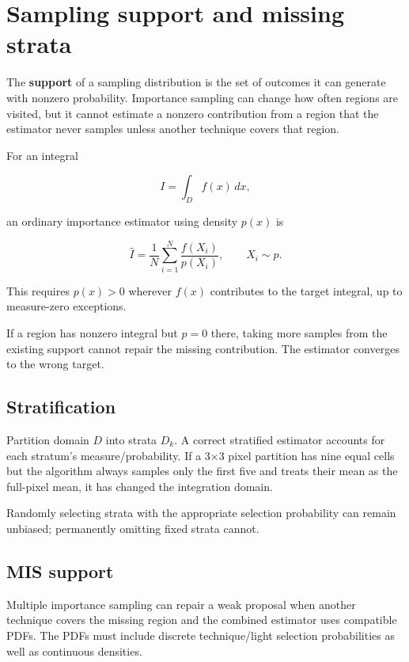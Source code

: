 \hypertarget{appendix-10308c3d753e}{}
\section{Sampling support and missing strata}\label{appendix-10308c3d753e-sampling-support-and-missing-strata}

The \textbf{support} of a sampling distribution is the set of outcomes it can generate with nonzero probability. Importance sampling can change how often regions are visited, but it cannot estimate a nonzero contribution from a region that the estimator never samples unless another technique covers that region.

For an integral

\[
I=\int_D f(x)\,dx,
\]

an ordinary importance estimator using density \(p(x)\) is

\[
\hat I=\frac1N\sum_{i=1}^N\frac{f(X_i)}{p(X_i)},
\qquad X_i\sim p.
\]

This requires \(p(x)>0\) wherever \(f(x)\) contributes to the target integral, up to measure-zero exceptions.

If a region has nonzero integral but \(p=0\) there, taking more samples from the existing support cannot repair the missing contribution. The estimator converges to the wrong target.

\subsection{Stratification}\label{appendix-10308c3d753e-stratification}

Partition domain \(D\) into strata \(D_k\). A correct stratified estimator accounts for each stratum's measure/probability. If a 3×3 pixel partition has nine equal cells but the algorithm always samples only the first five and treats their mean as the full-pixel mean, it has changed the integration domain.

Randomly selecting strata with the appropriate selection probability can remain unbiased; permanently omitting fixed strata cannot.

\subsection{MIS support}\label{appendix-10308c3d753e-mis-support}

Multiple importance sampling can repair a weak proposal when another technique covers the missing region and the combined estimator uses compatible PDFs. The PDFs must include discrete technique/light selection probabilities as well as continuous densities.

